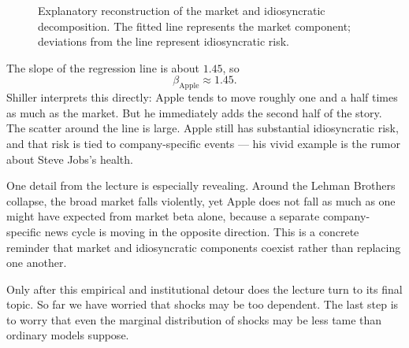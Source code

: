 \begin{figure}[htbp]
\centering
{}
\caption{Explanatory reconstruction of the market and idiosyncratic decomposition. The fitted line represents the market component; deviations from the line represent idiosyncratic risk.}
\end{figure}

The slope of the regression line is about \(1.45\), so
\begin{equation}
\beta_{\mathrm{Apple}}\approx 1.45.
\end{equation}
Shiller interprets this directly: Apple tends to move roughly one and a half times as much as the market. But he immediately adds the second half of the story. The scatter around the line is large. Apple still has substantial idiosyncratic risk, and that risk is tied to company-specific events --- his vivid example is the rumor about Steve Jobs's health.

One detail from the lecture is especially revealing. Around the Lehman Brothers collapse, the broad market falls violently, yet Apple does not fall as much as one might have expected from market beta alone, because a separate company-specific news cycle is moving in the opposite direction. This is a concrete reminder that market and idiosyncratic components coexist rather than replacing one another.

Only after this empirical and institutional detour does the lecture turn to its final topic. So far we have worried that shocks may be too dependent. The last step is to worry that even the marginal distribution of shocks may be less tame than ordinary models suppose.

